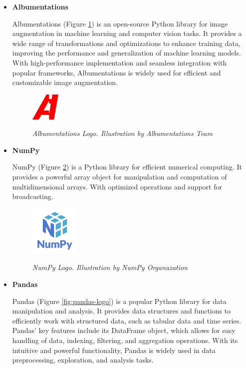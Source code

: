 \begin{itemize}
  \item \textbf{Albumentations}

    Albumentations (Figure \ref{fig:albumentations-logo}) is an
    open-source Python library for image augmentation in machine learning and
    computer vision tasks. It provides a wide range of transformations and
    optimizations to enhance training data, improving the performance and
    generalization of machine learning models. With high-performance
    implementation and seamless integration with popular frameworks,
    Albumentations is widely used for efficient and customizable image
    augmentation.

    \begin{figure}[H] \centering
      \includegraphics[width=0.13\textwidth]{imatges/studies_and_decisions/albumentations-logo.png}
      \caption[Albumentations Logo]{\textit{Albumentations Logo. Illustration
      by Albumentations Team}} {\label{fig:albumentations-logo}} \end{figure}

    \item \textbf{NumPy}

    NumPy (Figure \ref{fig:numpy-logo}) is a Python library for
    efficient numerical computing. It provides a powerful array object for
    manipulation and computation of multidimensional arrays. With optimized
    operations and support for broadcasting.

    \begin{figure}[H]
      \centering
      \includegraphics[width=0.225\textwidth]{imatges/studies_and_decisions/numpy-logo.png}
      \caption[NumPy Logo]{\textit{NumPy Logo. Illustration by NumPy Organazation}}
      {\label{fig:numpy-logo}}
    \end{figure}

  \item \textbf{Pandas}

    Pandas (Figure \ref{fig:pandas-logo}) is a popular Python library
    for data manipulation and analysis. It provides data structures and
    functions to efficiently work with structured data, such as tabular data
    and time series. Pandas' key features include its DataFrame object, which
    allows for easy handling of data, indexing, filtering, and aggregation
    operations. With its intuitive and powerful functionality, Pandas is widely
    used in data preprocessing, exploration, and analysis tasks.


\end{itemize}
